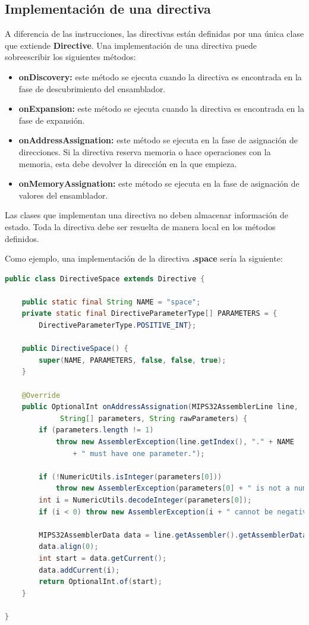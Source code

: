 \subsection{Implementación de una directiva}\label{subsec:implementacion-de-una-directiva}

A diferencia de las instrucciones, las directivas
están definidas por una única clase que extiende \textbf{Directive}.
Una implementación de una directiva puede sobreescribir los siguientes métodos:
\begin{itemize}
    \item \textbf{onDiscovery:} este método se ejecuta cuando la directiva
    es encontrada en la fase de descubrimiento del ensamblador.
    \item \textbf{onExpansion:} este método se ejecuta cuando la directiva
    es encontrada en la fase de expansión.
    \item \textbf{onAddressAssignation:} este método se ejecuta en la fase
    de asignación de direcciones.
    Si la directiva reserva memoria o hace operaciones con la memoria,
    esta debe devolver la dirección en la que empieza.
    \item \textbf{onMemoryAssignation:} este método se ejecuta en la fase
    de asignación de valores del ensamblador.
\end{itemize}

\noindent Las clases que implementan una directiva no deben
almacenar información de estado.
Toda la directiva debe ser resuelta de manera local en los métodos definidos.

\noindent Como ejemplo, una implementación de la directiva
\textbf{.space} sería la siguiente:

\begin{lstlisting}[language=Java,style=java,frame=single,label={lst:directive-space}]
public class DirectiveSpace extends Directive {

    public static final String NAME = "space";
    private static final DirectiveParameterType[] PARAMETERS = {
        DirectiveParameterType.POSITIVE_INT};

    public DirectiveSpace() {
        super(NAME, PARAMETERS, false, false, true);
    }

    @Override
    public OptionalInt onAddressAssignation(MIPS32AssemblerLine line,
             String[] parameters, String rawParameters) {
        if (parameters.length != 1)
            throw new AssemblerException(line.getIndex(), "." + NAME
                + " must have one parameter.");

        if (!NumericUtils.isInteger(parameters[0]))
            throw new AssemblerException(parameters[0] + " is not a number.");
        int i = NumericUtils.decodeInteger(parameters[0]);
        if (i < 0) throw new AssemblerException(i + " cannot be negative.");

        MIPS32AssemblerData data = line.getAssembler().getAssemblerData();
        data.align(0);
        int start = data.getCurrent();
        data.addCurrent(i);
        return OptionalInt.of(start);
    }

}
\end{lstlisting}

